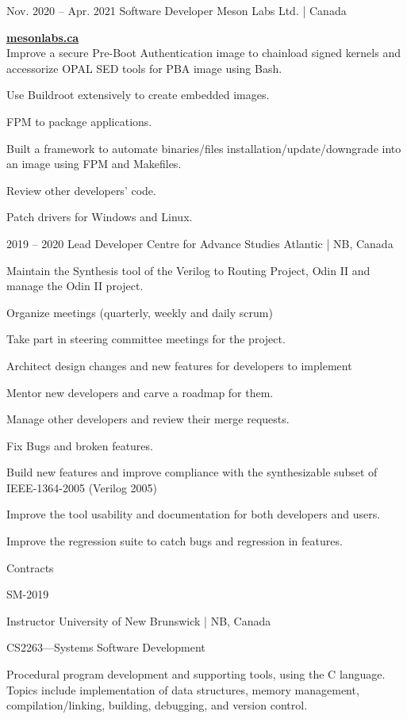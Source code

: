 \documentclass{developercv} %
\begin{document}
\entrys
{Nov. 2020 -- Apr. 2021}
{Software Developer}
{Meson Labs Ltd. | Canada}{
	\textbf{\href{https://www.mesonlabs.ca/}{mesonlabs.ca}}\\
	Improve a secure Pre-Boot Authentication image to chainload signed kernels and accessorize OPAL SED tools for PBA image using Bash.
	\begin{tightemize}
		\item Use Buildroot extensively to create embedded images.
		\item FPM to package applications.
		\item Built a framework to automate binaries/files installation/update/downgrade into an image using FPM and Makefiles.
		\item Review other developers' code.
		\item Patch drivers for Windows and Linux.
	\end{tightemize}
}

\entrys
{2019 -- 2020}
{Lead Developer}
{Centre for Advance Studies Atlantic | NB, Canada}{
	Maintain the Synthesis tool of the Verilog to Routing Project, Odin II and manage the Odin II project.
	\begin{tightemize}
		\item Organize meetings (quarterly, weekly and daily scrum)
		\item Take part in steering committee meetings for the project.
		\item Architect design changes and new features for developers to implement
		\item Mentor new developers and carve a roadmap for them.
		\item Manage other developers and review their merge requests.
		\item Fix Bugs and broken features.
		\item Build new features and improve compliance with the synthesizable subset of IEEE-1364-2005 (Verilog 2005)
		\item Improve the tool usability and documentation for both developers and users.
		\item Improve the regression suite to catch bugs and regression in features.
	\end{tightemize}
}

\entrys
{
	Contracts\\
	\begin{tightemize}
		\item[] {\footnotesize SM-2019}
	\end{tightemize}
}
{Instructor}
{University of New Brunswick | NB, Canada}
{
	\begin{tightemize}
		\item CS2263---Systems Software Development
		\begin{smallQuote}
			Procedural program development and supporting tools, using the C language.
			Topics include implementation of data structures, memory management, compilation/linking, building, debugging, and version control.
		\end{smallQuote}
	\end{tightemize}

}
\end{document}

